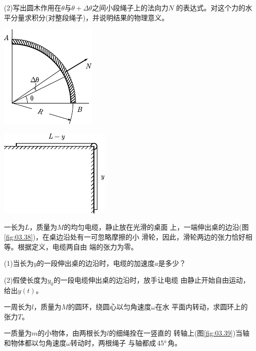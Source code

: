 \begin{exercises}
(2)写出圆木作用在$ \theta $与$  \theta + \Delta \theta  $之间小段绳子上的法向力$ N $
的表达式。对这个力的水平分量求积分(对整段绳子)，并说明结果的物理意义。
\begin{figurex}
	\begin{minipage}[b]{0.5\linewidth}
		\centering
		\includegraphics{figure/fig03.37}
		\caption{}
		\label{fig:03.37}
	\end{minipage}
	\begin{minipage}[b]{0.5\linewidth}
		\centering
		\includegraphics{figure/fig03.38}
		\caption{}
		\label{fig:03.38}
	\end{minipage}
	\vspace{-1.56em}
\end{figurex}

\exercise 一长为$ L $，质量为$ M $的均匀电缆，静止放在光滑的桌面
上，一端伸出桌的边沿(图\ref{fig:03.38})，在桌边沿处有一可忽略摩擦的小
滑轮，因此，滑轮两边的张力恰好相等。根据定义，电缆两自由
端的张力为零。

(1)当长为$ y $的一段伸出桌的边沿时，电缆的加速度$ a $是多少？

(2)假使长度为$  y _ { 0 }  $的一段电缆伸出桌的边沿时，放手让电缆
由静止开始自由运动，给出$ y(t) $。

\exercise 一周长为$ l $，质量为$ M $的圆环，绕圆心以匀角速度$ \omega $在水
平面内转动，求圆环上的张力$ T $。

\exercise 一质量为$ m $的小物体，由两根长为$ l $的细绳拴在一竖直的
转轴上(图\ref{fig:03.39})当轴和物体都以匀角速度$ \omega $转动时，两根绳子
与轴都成\,\ang{45}\,角。


\end{exercises}
